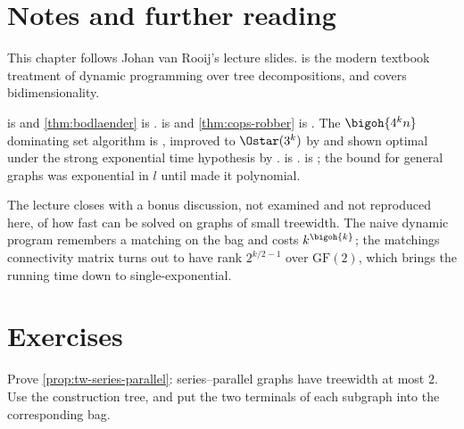 \section{Notes and further reading}
\label{sec:tw-further-reading}

This chapter follows Johan van Rooij's lecture slides.
\citet[Chapter~7]{CyganEtAl2015} is the modern textbook treatment of dynamic
programming over tree decompositions, and \citet[Chapter~11]{CyganEtAl2015}
covers bidimensionality.

 is \citet{ArnborgCorneilProskurowski1987} and
\cref{thm:bodlaender} is \citet{Bodlaender1996}.
 is \citet{Courcelle1990} and
\cref{thm:cops-robber} is \citet{SeymourThomas1993}. The
$\bigoh{4^k n}$ dominating set algorithm is
\citet{AlberBodlaenderFernauKloksNiedermeier2002}, improved to $\Ostar(3^k)$ by
\citet{VanRooijBodlaenderRossmanith2009} and shown optimal under the strong
exponential time hypothesis by \citet{LokshtanovMarxSaurabh2018}.
 is \citet{FominHoie2006}.
 is \citet{RobertsonSeymour1986}; the bound for general
graphs was exponential in $l$ until \citet{ChekuriChuzhoy2016} made it
polynomial.

The lecture closes with a bonus discussion, not examined and not reproduced
here, of how fast  can be solved on graphs of small
treewidth. The naive dynamic program remembers a matching on the bag and costs
$k^{\bigoh{k}}$; the matchings connectivity matrix turns out to have rank
$2^{k/2-1}$ over $\mathrm{GF}(2)$, which brings the running time down to
single-exponential.

\section{Exercises}
\label{sec:ex-treewidth}

\begin{exercise}\label{ex:tw-series-parallel}
Prove \cref{prop:tw-series-parallel}: series--parallel graphs have treewidth at
most $2$. Use the construction tree, and put the two terminals of each subgraph
into the corresponding bag.
\end{exercise}

